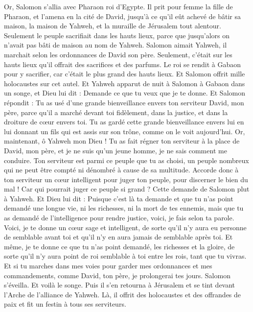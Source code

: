 \begin{multicols}{2}
\VerseOne{}Or, Salomon s'allia avec Pharaon roi d'Egypte. Il prit pour femme la fille de Pharaon, et l'amena en la cité de David, jusqu'à ce qu'il eût achevé de bâtir sa maison, la maison de Yahweh, et la muraille de Jérusalem tout alentour.
Seulement le peuple sacrifiait dans les hauts lieux, parce que jusqu’alors on n’avait pas bâti de maison au nom de Yahweh.
Salomon aimait Yahweh, il marchait selon les ordonnances de David son père. Seulement, c’était sur les hauts lieux qu’il offrait des sacrifices et des parfums.
Le roi se rendit à Gabaon pour y sacrifier, car c'était le plus grand des hauts lieux. Et Salomon offrit mille holocaustes sur cet autel.
Et Yahweh apparut de nuit à Salomon à Gabaon dans un songe, et Dieu lui dit : Demande ce que tu veux que je te donne.
Et Salomon répondit : Tu as usé d'une grande bienveillance envers ton serviteur David, mon père, parce qu’il a marché devant toi fidèlement, dans la justice, et dans la droiture de cœur envers toi. Tu as gardé cette grande bienveillance envers lui en lui donnant un fils qui est assis sur son trône, comme on le voit aujourd'hui.
Or, maintenant, ô Yahweh mon Dieu ! Tu as fait régner ton serviteur à la place de David, mon père, et je ne suis qu'un jeune homme, je ne sais comment me conduire.
Ton serviteur est parmi ce peuple que tu as choisi, un peuple nombreux qui ne peut être compté ni dénombré à cause de sa multitude.
Accorde donc à ton serviteur un cœur intelligent pour juger ton peuple, pour discerner le bien du mal ! Car qui pourrait juger ce peuple si grand ?
Cette demande de Salomon plut à Yahweh.
Et Dieu lui dit : Puisque c’est là ta demande et que tu n'as point demandé une longue vie, ni les richesses, ni la mort de tes ennemis, mais que tu as demandé de l'intelligence pour rendre justice,
voici, je fais selon ta parole. Voici, je te donne un cœur sage et intelligent, de sorte qu'il n'y aura eu personne de semblable avant toi et qu’il n'y en aura jamais de semblable après toi.
Et même, je te donne ce que tu n'as point demandé, les richesses et la gloire, de sorte qu'il n'y aura point de roi semblable à toi entre les rois, tant que tu vivras.
Et si tu marches dans mes voies pour garder mes ordonnances et mes commandements, comme David, ton père, je prolongerai tes jours.
Salomon s’éveilla. Et voilà le songe. Puis il s'en retourna à Jérusalem et se tint devant l'Arche de l'alliance de Yahweh. Là, il offrit des holocaustes et des offrandes de paix et fit un festin à tous ses serviteurs.

\end{multicols}
